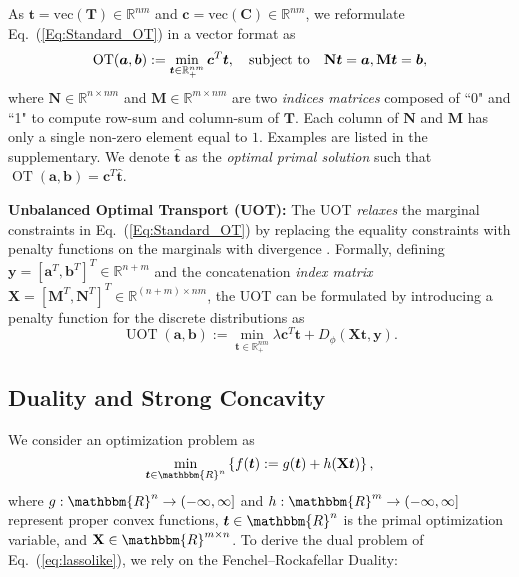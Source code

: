 \documentclass[11pt]{article}
\newcommand{\R}{\mathbb{R}}
\newcommand{\mat}[1]{\mathbf{#1}}
\renewcommand{\vec}[1]{\bm{#1}}
\begin{document}
As $\vec{t}\!=\!\text{vec}({\mat{T}}) \in \mathbb{R}^{nm}$ and $\vec{c}\!=\!\text{vec}({\mat{C}}) \in \mathbb{R}^{nm}$, we reformulate Eq.~(\ref{Eq:Standard_OT}) in a vector format as \cite{Chapel_NeurIPS_2021}
\begin{eqnarray}
\label{Eq:Vector_OT}
\operatorname{OT}(\vec{a},\vec{b}) := \min_{\vec{t} \in \R_{+}^{nm}} \vec{c}^T\vec{t}, \quad
\text{subject\ to}\quad \mat{N}\vec{t} = \vec{a}, \mat{M}\vec{t} = \vec{b}, \notag
\end{eqnarray}
where $\mat{N} \in \R^{n \times nm}$ and $\mat{M} \in \R^{m \times nm}$ are two {\it indices matrices} composed of ``0" and ``1" to compute row-sum and column-sum of $\mat T$. Each column of $\mat{N}$ and $\mat{M}$ has only a single non-zero element equal to $1$. Examples are listed in the supplementary. We denote $\hat{\vec t}$ as the {\it optimal primal solution} such that $\operatorname{OT}(\vec{a},\vec{b}) = \vec c^{T}\hat{\vec t}$.


{\bf Unbalanced Optimal Transport (UOT):}  The UOT {\it relaxes} the marginal constraints in Eq.~(\ref{Eq:Standard_OT}) by replacing the equality constraints with penalty functions on the marginals with divergence \cite{Caffarelli_AM_2010,chizat2017scaling}. Formally, defining $\vec{y} = [\vec{a}^T, \vec{b}^T]^T \in \mathbb{R}^{n+m}$ and the concatenation {\it index matrix} $\mat{X} = [\mat{M}^T,\mat{N}^T]^T \in \mathbb{R}^{(n+m) \times nm}$, the UOT can be formulated by introducing a penalty function for the discrete distributions as \cite{Chapel_NeurIPS_2021}
\begin{equation}
\label{eq:uot}
\operatorname{UOT}(\vec{a},\vec{b}) := \min_{\vec{t} \in \R_{+}^{nm}} \lambda\vec{c}^T\vec{t} + D_\phi(\mat{X}\vec{t},\vec{y}).
\end{equation}


\subsection{Duality and Strong Concavity}
We consider an optimization problem as
\begin{equation}
\label{eq:lassolike}
\min_{\vec{t} \in \mathbbm{R}^{n}} \left\{ f(\vec{t}) := g(\vec{t}) + h(\mat{X} \vec{t}) \right\},
\end{equation}
where $g: \mathbbm{R}^{n} \rightarrow (-\infty, \infty]$ and $h: \mathbbm{R}^{m} \rightarrow (-\infty, \infty]$ represent proper convex functions, $\vec{t} \in \mathbbm{R}^{n}$ is the primal optimization variable, and $\mat{X}\in \mathbbm{R}^{m\times n}$.
To derive the dual problem of Eq.~(\ref{eq:lassolike}), we rely on the Fenchel--Rockafellar Duality:
\end{document}

